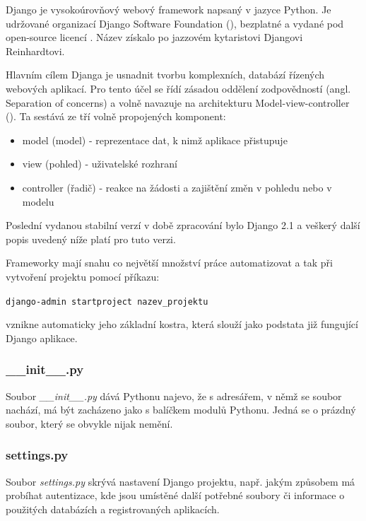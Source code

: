 
Django je vysokoúrovňový webový framework napsaný v jazyce Python. Je udržované organizací Django Software Foundation (), bezplatné a vydané pod open-source licencí . Název získalo po jazzovém kytaristovi Djangovi Reinhardtovi.

Hlavním cílem Djanga je usnadnit tvorbu komplexních, databází řízených webových aplikací. Pro tento účel se řídí zásadou oddělení zodpovědností (angl. Separation of concerns) a volně navazuje na architekturu Model-view-controller (). Ta sestává ze tří volně propojených komponent:
\begin{itemize}
\item model (model) - reprezentace dat, k nimž aplikace přistupuje
\item view (pohled) - uživatelské rozhraní
\item controller (řadič) - reakce na žádosti a zajištění změn v pohledu nebo v modelu
\end{itemize}

Poslední vydanou stabilní verzí v době zpracování bylo Django 2.1 a veškerý další popis uvedený níže platí pro tuto verzi.

Frameworky mají snahu co největší množství práce automatizovat a tak při vytvoření projektu pomocí příkazu:

\begin{center}
\texttt{django-admin startproject nazev\_projektu}
\end{center}

vznikne automaticky jeho základní kostra, která slouží jako podstata již fungující Django aplikace.


\subsubsection{\_\_init\_\_.py}
Soubor \textit{\_\_init\_\_.py} dává Pythonu najevo, že s adresářem, v němž se soubor nachází, má být zacházeno jako s balíčkem modulů Pythonu. Jedná se o prázdný soubor, který se obvykle nijak nemění.

\subsubsection{settings.py}
\label{settings}
Soubor \textit{settings.py} skrývá nastavení Django projektu, např. jakým způsobem má probíhat autentizace, kde jsou umístěné další potřebné soubory či informace o použitých databázích a registrovaných aplikacích.

